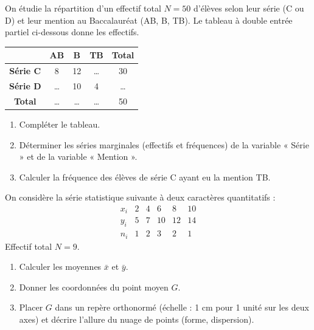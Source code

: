 \documentclass[11pt]{article}
\begin{document}
\begin{exercice}
On étudie la répartition d'un effectif total $N=50$ d'élèves selon leur série (C ou D) et leur mention au Baccalauréat (AB, B, TB). Le tableau à double entrée partiel ci-dessous donne les effectifs.

\begin{center}
\begin{tabular}{|c|c|c|c|c|}
\hline
 & \textbf{AB} & \textbf{B} & \textbf{TB} & \textbf{Total} \\
\hline
\textbf{Série C} & 8 & 12 & \ldots & 30 \\
\hline
\textbf{Série D} & \ldots & 10 & 4 & \ldots \\
\hline
\textbf{Total} & \ldots & \ldots & \ldots & 50 \\
\hline
\end{tabular}
\end{center}

\begin{enumerate}
    \item Compléter le tableau.
    \item Déterminer les séries marginales (effectifs et fréquences) de la variable « Série » et de la variable « Mention ».
    \item Calculer la fréquence des élèves de série C ayant eu la mention TB.
\end{enumerate}
\end{exercice}

\begin{exercice}
On considère la série statistique suivante à deux caractères quantitatifs :
\[
\begin{array}{c|ccccc}
x_i & 2 & 4 & 6 & 8 & 10 \\
\hline
y_i & 5 & 7 & 10 & 12 & 14 \\
\hline
n_i & 1 & 2 & 3 & 2 & 1
\end{array}
\]
Effectif total $N = 9$.

\begin{enumerate}
    \item Calculer les moyennes $\bar{x}$ et $\bar{y}$.
    \item Donner les coordonnées du point moyen $G$.
    \item Placer $G$ dans un repère orthonormé (échelle : 1 cm pour 1 unité sur les deux axes) et décrire l'allure du nuage de points (forme, dispersion).
\end{enumerate}
\end{exercice}
\end{document}
